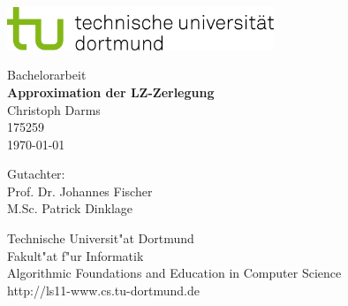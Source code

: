 \begin{titlepage}
		\vspace*{-3cm}
		\newlength{\links}
		\setlength{\links}{-1.5cm}
		\sffamily
		\hspace*{\links}
		\begin{minipage}{12.5cm}
			\includegraphics[width=8cm]{tud_logo_rgb}
		\end{minipage}
		
		\vspace*{3cm}
		
		\hspace*{\links}
		\hspace*{-0.2cm}
		\begin{minipage}{9cm}
			\large
			\begin{center}
				{\Large Bachelorarbeit} \\
				\vspace*{1cm}
				\textbf{Approximation der LZ-Zerlegung} \\
				\vspace*{1cm}
				Christoph Darms\\
				175259\\
				\today
			\end{center}
		\end{minipage}
		\normalsize
		\vspace*{5.5cm}
		
		
		\vspace*{2.1cm}
		
		\hspace*{\links}
		\begin{minipage}[b]{5cm}
			\raggedright
			Gutachter: \\
			Prof. Dr. Johannes Fischer \\
			M.Sc. Patrick Dinklage
		\end{minipage}
		
		\vspace*{2.5cm}
		\hspace*{\links}
		\begin{minipage}[b]{8cm}
			\raggedright
			Technische Universit"at Dortmund \\
			Fakult"at f"ur Informatik\\
			Algorithmic Foundations and Education in Computer Science\\
			http://ls11-www.cs.tu-dortmund.de
		\end{minipage}
		
		
	\end{titlepage}

